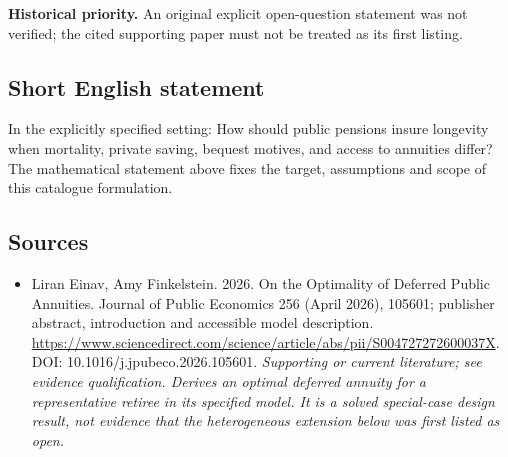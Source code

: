 \documentclass[11pt]{article}
\begin{document}
\par\textbf{Historical priority.} An original explicit open-question statement was not verified; the cited supporting paper must not be treated as its first listing.

\subsection{Short English statement}
In the explicitly specified setting: How should public pensions insure longevity when mortality, private saving, bequest motives, and access to annuities differ? The mathematical statement above fixes the target, assumptions and scope of this catalogue formulation.

\subsection{Sources}
\begin{itemize}\raggedright
\item[\textnormal{[S1]}]\hypertarget{source:30007761:1}{} Liran Einav, Amy Finkelstein. 2026. On the Optimality of Deferred Public Annuities. Journal of Public Economics 256 (April 2026), 105601; publisher abstract, introduction and accessible model description.
\url{https://www.sciencedirect.com/science/article/abs/pii/S004727272600037X}.
DOI: 10.1016/j.jpubeco.2026.105601.
{\small\textit{Supporting or current literature; see evidence qualification. Derives an optimal deferred annuity for a representative retiree in its specified model. It is a solved special-case design result, not evidence that the heterogeneous extension below was first listed as open.}}
\end{itemize}
\end{document}
